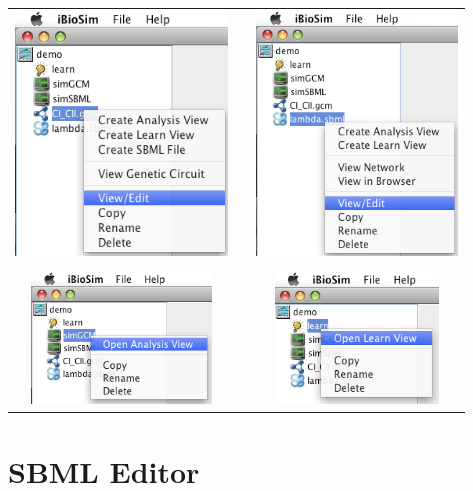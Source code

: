 \documentclass[titlepage,11pt]{article}
\begin{document}
\begin{center}
\begin{tabular}{ccc}
\includegraphics[height=65mm]{screenshots/modGCM} & &
\includegraphics[height=65mm]{screenshots/modSBML} \\ \\
\includegraphics[height=35mm]{screenshots/modAnalysis} & &
\includegraphics[height=35mm]{screenshots/modLearn}
\end{tabular}
\end{center}

\section{\label{SBMLEdit}SBML Editor}
\end{document}
